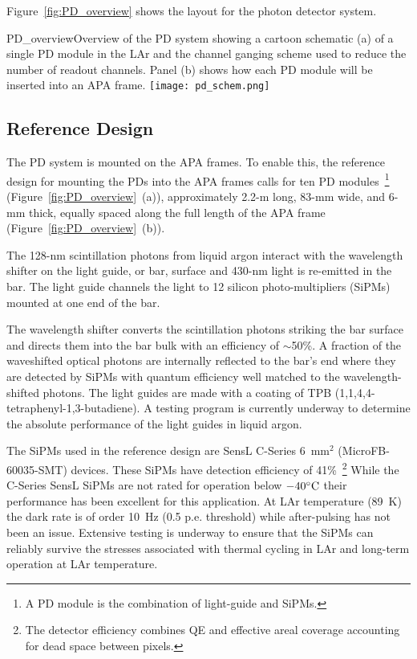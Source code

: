 Figure~\ref{fig:PD_overview} shows the layout for the photon
detector system. %

\begin{cdrfigure}[PD Overview]{PD_overview}{Overview of the PD
    system showing a cartoon schematic (a) of a single PD module
    in the LAr and the channel ganging scheme used to reduce the
    number of readout channels. Panel (b) shows how each PD module
    will be inserted into an APA frame. }
\texttt{[image: pd\_schem.png]}
\end{cdrfigure}

\subsection{Reference Design}
\label{sec:detectors-fd-ref-pd-refsystem}   %

The PD system is mounted on the APA frames.  To enable this, the
reference design for mounting the PDs into the APA frames calls for
ten PD modules~\footnote{A PD module is the combination of light-guide
and SiPMs.} (Figure~\ref{fig:PD_overview}~(a)), approximately 2.2-m
long, 83-mm wide, and 6-mm thick, equally spaced along the full length
of the APA frame (Figure~\ref{fig:PD_overview}~(b)).

The 128-nm scintillation photons from liquid argon interact with the
wavelength shifter on the light guide, or bar, surface and 430-nm light is
re-emitted in the bar. The light guide channels the light to
12 silicon photo-multipliers (SiPMs) mounted at one end of the bar.

The wavelength shifter converts the scintillation photons striking the
bar surface and directs them into the bar bulk with an efficiency of
$\sim$50\%.  A fraction of the waveshifted optical photons are
internally reflected to the bar's end where they are detected by SiPMs
with quantum efficiency well matched to the wavelength-shifted
photons. The light guides are made with a coating of TPB
(1,1,4,4-tetraphenyl-1,3-butadiene). A testing program is currently
underway to determine the absolute performance of the light guides in
liquid argon.

The SiPMs used in the reference design are SensL C-Series 6~mm$^2$
(MicroFB-60035-SMT) devices. These SiPMs have detection efficiency of
41\%~\footnote{The detector efficiency combines QE and effective areal
  coverage accounting for dead space between pixels.} While the
C-Series SensL SiPMs are not rated for operation below
$-40^{\circ}{\rm C}$ their performance has been excellent for this
application. At LAr temperature (89~K) the dark rate is of order 10~Hz
(0.5 p.e. threshold) while after-pulsing has not been an
issue. Extensive testing is underway to ensure that the SiPMs can
reliably survive the stresses associated with thermal cycling in LAr
and long-term operation at LAr temperature.

